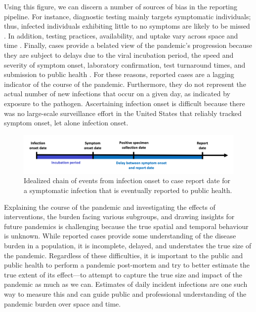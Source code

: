 \documentclass{article}
\begin{document}
Using this figure, we can discern a number of sources of bias in the reporting
pipeline. For instance, diagnostic testing mainly targets symptomatic
individuals; thus, infected individuals exhibiting little to no symptoms are
likely to be missed \citep{cdc2022estimated}. In addition, testing practices,
availability, and uptake vary across space and time \citep{pitzer2021impact,
ecdc2020strategies, hitchings2021usefulness}. Finally, cases provide a belated
view of the pandemic's progression because they are subject to delays due to the
viral incubation period, the speed and severity of symptom onset, laboratory
confirmation, test turnaround times, and submission to public health
\citep{pellis2021challenges, wash2020dash}. For these reasons, reported cases
are a lagging indicator of the course of the pandemic. Furthermore, they do not
represent the actual number of new infections that occur on a given day, as
indicated by exposure to the pathogen. Ascertaining infection onset is difficult
because there was no large-scale surveillance effort in the United States that
reliably tracked symptom onset, let alone infection onset.

\begin{figure}[!tb]
\centering
    \includegraphics[width=.99\textwidth]{Chain_of_events_onset_report.pdf} 
    \caption{Idealized chain of events from infection onset to case report date 
    for a symptomatic infection that is eventually reported to public health.}
    \label{fig:chain_events_onset_report}
\end{figure}


Explaining the course of the pandemic and investigating the effects of
interventions, the burden facing various subgroups, and drawing insights for
future pandemics is challenging because the true spatial and temporal behaviour
is unknown. While reported cases provide some understanding of the disease
burden in a population, it is incomplete, delayed, and understates the true size
of the pandemic. Regardless of these difficulties, it is important to the public
and public health to perform a pandemic post-mortem and try to better estimate the
true extent of its effect---to attempt to capture the true size and impact of
the pandemic as much as we can. Estimates of daily incident infections are one
such way to measure this and can guide public and professional understanding of
the pandemic burden over space and time.
\end{document}
